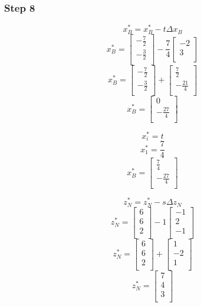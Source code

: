 \documentclass[14pt]{extarticle}
\begin{document}
\subsubsection*{Step 8}
\[
    x^*_B = x^*_B - t \Delta x_B
\]
\[
    x^*_B = \begin{bmatrix}
        -\frac{7}{2} \\
        -\frac{3}{2} \\
    \end{bmatrix}
    - \frac{7}{4} \begin{bmatrix}
        -2 \\
        3 \\
    \end{bmatrix}
\]
\[
    x^*_B = \begin{bmatrix}
        -\frac{7}{2} \\
        -\frac{3}{2} \\
    \end{bmatrix}
    + \begin{bmatrix}
        \frac{7}{2} \\
        -\frac{21}{4} \\
    \end{bmatrix}
\]
\[
    x^*_B = \begin{bmatrix}
        0 \\
        -\frac{27}{4} \\
    \end{bmatrix}
\]


\[
    x^*_i = t
\]
\[
    x^*_1 = \frac{7}{4}
\]
\[
    x^*_B = \begin{bmatrix}
        \frac{7}{4} \\
        -\frac{27}{4} \\
    \end{bmatrix}
\]

\[
    z^*_N = z^*_N - s \Delta z_N
\]
\[
    z^*_N = \begin{bmatrix}
        6 \\
        6 \\
        2 \\
    \end{bmatrix}
    - 1 \begin{bmatrix}
        -1 \\
        2 \\
        -1 \\
    \end{bmatrix}
\]
\[
    z^*_N = \begin{bmatrix}
        6 \\
        6 \\
        2 \\
    \end{bmatrix}
    + \begin{bmatrix}
        1 \\
        -2 \\
        1 \\
    \end{bmatrix}
\]
\[
    z^*_N = \begin{bmatrix}
        7 \\
        4 \\
        3 \\
    \end{bmatrix}
\]
\end{document}

